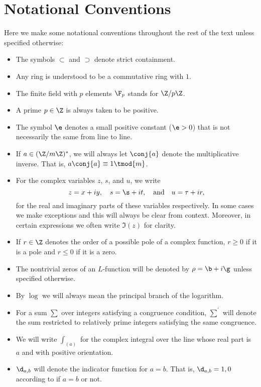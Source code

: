     \section{Notational Conventions}
      Here we make some notational conventions throughout the rest of the text unless specified otherwise:
      \begin{itemize}
        \item The symbols $\subset$ and $\supset$ denote strict containment.
        \item Any ring is understood to be a commutative ring with $1$.
        \item The finite field with $p$ elements $\F_{p}$ stands for $\Z/p\Z$.
        \item A prime $p \in \Z$ is always taken to be positive.
        \item The symbol $\e$ denotes a small positive constant ($\e > 0$) that is not necessarily the same from line to line.
        \item If $a \in (\Z/m\Z)^{\ast}$, we will always let $\conj{a}$ denote the multiplicative inverse. That is, $a\conj{a} \equiv 1 \tmod{m}$.  
        \item For the complex variables $z$, $s$, and $u$, we write
        \[
          z = x+iy, \quad s = \s+it, \quad \text{and} \quad u = \tau+ir,
        \]
        for the real and imaginary parts of these variables respectively. In some cases we make exceptions and this will always be clear from context. Moreover, in certain expressions we often write $\Im(z)$ for clarity.
        \item If $r \in \Z$ denotes the order of a possible pole of a complex function, $r \ge 0$ if it is a pole and $r \le 0$ if it is a zero.
        \item The nontrivial zeros of an $L$-function will be denoted by $\rho = \b+i\g$ unless specified otherwise.
        \item By $\log$ we will always mean the principal branch of the logarithm.
        \item For a sum $\sum$ over integers satisfying a congruence condition, $\sum^{'}$ will denote the sum restricted to relatively prime integers satisfying the same congruence.
        \item We will write $\int_{(a)}$ for the complex integral over the line whose real part is $a$ and with positive orientation.
        \item $\d_{a,b}$ will denote the indicator function for $a = b$. That is, $\d_{a,b} = 1,0$ according to if $a = b$ or not.
      \end{itemize}
